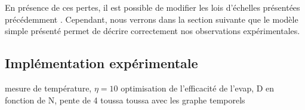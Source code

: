 En présence de ces pertes, il est possible de modifier les lois d'échelles présentées précédemment \citep{luiten1996kinetic}\citep{brantut2009manipulation}. Cependant, nous verrons dans la section suivante que le modèle simple présenté permet de décrire correctement nos observations expérimentales.



\subsection{Implémentation expérimentale}
mesure de température, $\eta=10$
optimisation de l'efficacité de l'evap, D en fonction de N, pente de 4 toussa toussa avec les graphe temporels